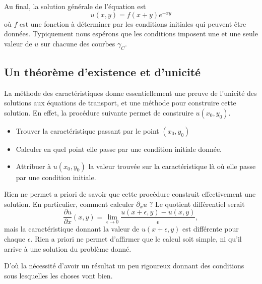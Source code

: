 Au final, la solution générale de l'équation est
\begin{equation}
    u(x,y)=f(x+y) e^{-xy}
\end{equation}
où \( f\) est une fonction à déterminer par les conditions initiales qui peuvent être données. Typiquement nous espérons que les conditions imposent une et une seule valeur de \( u\) sur chacune des courbes \( \gamma_C\).

\subsection{Un théorème d'existence et d'unicité}

La méthode des caractéristiques donne essentiellement une preuve de l'unicité des solutions aux équations de transport, et une méthode pour construire cette solution. En effet, la procédure suivante permet de construire \( u(x_0,y_0)\).
\begin{itemize}
    \item Trouver la caractéristique passant par le point \( (x_0,y_0)\)
    \item Calculer en quel point elle passe par une condition initiale donnée.
    \item Attribuer à \( u(x_0,y_0)\) la valeur trouvée sur la caractéristique là où elle passe par une condition initiale.
\end{itemize}
Rien ne permet a priori de savoir que cette procédure construit effectivement une solution. En particulier, comment calculer \( \partial_xu\) ? Le quotient différentiel serait
\begin{equation}
    \frac{ \partial u }{ \partial x }(x,y)=\lim_{\epsilon\to 0}\frac{ u(x+\epsilon,y)-u(x,y) }{ \epsilon },
\end{equation}
mais la caractéristique donnant la valeur de \( u(x+\epsilon,y)\) est différente pour chaque \( \epsilon\). Rien a priori ne permet d'affirmer que le calcul soit simple, ni qu'il arrive à une solution du problème donné.

D'où la nécessité d'avoir un résultat un peu rigoureux donnant des conditions sous lesquelles les choses vont bien.


